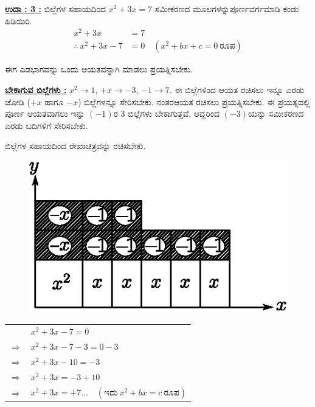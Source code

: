 \medskip

\noindent
{\textbf{\underline{ಉದಾ : 3 :}}} ಬಿಲ್ಲೆಗಳ ಸಹಾಯದಿಂದ $x^2 + 3x = 7$ ಸಮೀಕರಣದ ಮೂಲಗಳನ್ನು\break ಪೂರ್ಣವರ್ಗಮಾಡಿ ಕಂಡು ಹಿಡಿಯಿರಿ. 
\begin{align*}
x^2 + 3x &= 7\\
\therefore~ x^2 + 3x - 7 & = 0 \quad (x^2 + bx + c = 0~\text{ರೂಪ})
\end{align*}

ಈಗ ಎಡಭಾಗವನ್ನು ಒಂದು ಆಯತವನ್ನಾಗಿ ಮಾಡಲು ಪ್ರಯತ್ನಿಸಬೇಕು.

\medskip

\noindent
{\textbf{\underline{ಬೇಕಾಗುವ ಬಿಲ್ಲೆಗಳು :}}} $x^2 \rightarrow 1$, $+x \rightarrow -3$, $-1 \rightarrow 7$. ಈ ಬಿಲ್ಲೆಗಳಿಂದ ಆಯತ ರಚಿಸಲು ಇನ್ನೂ ಎರಡು ಜೋಡಿ ($+x$ ಹಾಗೂ $-x$) ಬಿಲ್ಲೆಗಳನ್ನೂ ಸೇರಿಸಬೇಕು. ನಂತರ\break ಆಯತ ರಚಿಸಲು ಪ್ರಯತ್ನಿಸಬೇಕು. ಈ ಪ್ರಯತ್ನದಲ್ಲಿ ಪೂರ್ಣ ಆಯತವಾಗಲು ಇನ್ನು $(-1)$ರ 3 ಬಿಲ್ಲೆಗಳು ಬೇಕಾಗುತ್ತವೆ. ಆದ್ದರಿಂದ $(-3)$ಯನ್ನು ಸಮೀಕರಣದ ಎರಡು ಬದಿಗಳಿಗೆ ಸೇರಿಸಬೇಕು.


ಬಿಲ್ಲೆಗಳ ಸಹಾಯದಿಂದ ರೇಖಾಚಿತ್ರವನ್ನು ರಚಿಸಬೇಕು.
\begin{figure}[H]
\centering
\includegraphics[scale=0.8]{src/figure/chap3/fig3-49.eps}
\end{figure} 

\begin{tabular}{ll}
& $x^2 + 3x - 7 = 0$\\
$\Rightarrow$ & $x^2 + 3x - 7 - 3 = 0 - 3$\\
$\Rightarrow$ & $x^2 + 3x - 10 = -3$\\
$\Rightarrow$ & $x^2 + 3x = -3 + 10$\\
$\Rightarrow$ & $x^2 + 3x = +7 \hdots\quad (\text{ಇದು}~ x^2 + bx = c ~\text{ರೂಪ})$
\end{tabular}

